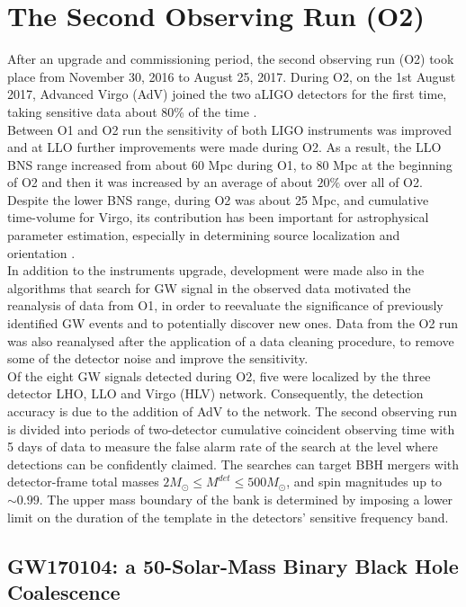 \documentclass[binding=0.6cm, LaM]{sapthesis}
\begin{document}
\section{The Second Observing Run (O2)}

	After an upgrade and commissioning period, the second observing run (O2) took place from November 30, 2016 to August 25, 2017. 
	During O2, on the 1st August 2017, Advanced Virgo (AdV) joined the two aLIGO detectors for the first time, 
	taking sensitive data about 80\% of the time \cite{13}.  \\
	Between O1 and O2 run the sensitivity of both LIGO instruments was improved and 
	at LLO further improvements were made during O2. 
	As a result, the LLO BNS range increased from about 60 Mpc during O1, 
	to 80 Mpc at the beginning of O2 and then it was increased 
	by an average of about $20\%$ over all of O2. 
 	Despite the lower BNS range, during O2 was about 25 Mpc, 
	and cumulative time-volume for Virgo, its contribution has been important 
	for astrophysical parameter estimation, especially in determining source localization and orientation \cite{56}. \\
	In addition to the instruments upgrade, development were made also
	in the algorithms that search for GW signal in the observed data motivated the reanalysis of data from O1, 
	in order to reevaluate the significance of previously identified GW events and to potentially discover new ones. 
	Data from the O2 run was also reanalysed after the application of a data cleaning procedure, 
	to remove some of the detector noise and improve the sensitivity. \\
	Of the eight GW signals detected during O2, five were localized by the three detector LHO, LLO and Virgo (HLV) network. 
	Consequently, the detection accuracy is  due to the addition of AdV to the network. 
	The second observing run is divided into periods of two-detector cumulative 
	coincident observing time with 5 days of data to measure the false alarm rate 
	of the search at the level where detections can be confidently claimed. 
	The searches can target BBH mergers with detector-frame total masses $2M_\odot \leq M^{det} \leq 500 M_\odot$,
	and spin magnitudes up to $\sim0.99$.
	The upper mass boundary of the bank is determined by imposing a lower limit on the duration of the template in the detectors’ sensitive frequency band.



\subsection{GW170104: a 50-Solar-Mass Binary Black Hole Coalescence}
\end{document}
